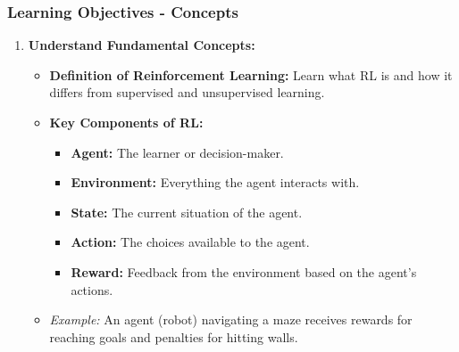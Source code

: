 \documentclass[aspectratio=169]{beamer}
\begin{document}
\begin{frame}[fragile]
    \frametitle{Learning Objectives - Concepts}
    \begin{enumerate}
        \item \textbf{Understand Fundamental Concepts:}
        \begin{itemize}
            \item \textbf{Definition of Reinforcement Learning:} Learn what RL is and how it differs from supervised and unsupervised learning.
            \item \textbf{Key Components of RL:}
            \begin{itemize}
                \item \textbf{Agent:} The learner or decision-maker.
                \item \textbf{Environment:} Everything the agent interacts with.
                \item \textbf{State:} The current situation of the agent.
                \item \textbf{Action:} The choices available to the agent.
                \item \textbf{Reward:} Feedback from the environment based on the agent's actions.
            \end{itemize}
            \item \textit{Example:} An agent (robot) navigating a maze receives rewards for reaching goals and penalties for hitting walls.
        \end{itemize}
    \end{enumerate}
\end{frame}
\end{document}

